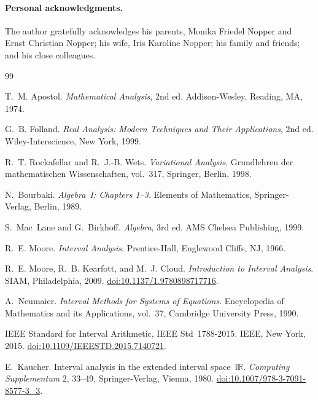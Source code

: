 \documentclass[11pt,a4paper]{article}
\theoremstyle{paperdef}
\begin{document}
\paragraph{Personal acknowledgments.} The author gratefully
acknowledges his parents, Monika Friedel Nopper and Ernst Christian
Nopper; his wife, Iris Karoline Nopper; his family and friends; and
his close colleagues.

\begin{thebibliography}{99}

T.~M. Apostol.
\newblock \emph{Mathematical Analysis}, 2nd ed.
\newblock Addison-Wesley, Reading, MA, 1974.

G.~B. Folland.
\newblock \emph{Real Analysis: Modern Techniques and Their
Applications}, 2nd ed.
\newblock Wiley-Interscience, New York, 1999.

R.~T. Rockafellar and R.~J.-B. Wets.
\newblock \emph{Variational Analysis}.
\newblock Grundlehren der mathematischen Wissenschaften, vol.~317,
Springer, Berlin, 1998.

N.~Bourbaki.
\newblock \emph{Algebra~I: Chapters 1--3}.
\newblock Elements of Mathematics, Springer-Verlag, Berlin, 1989.

S.~Mac~Lane and G.~Birkhoff.
\newblock \emph{Algebra}, 3rd ed.
\newblock AMS Chelsea Publishing, 1999.

R.~E. Moore.
\newblock \emph{Interval Analysis}.
\newblock Prentice-Hall, Englewood Cliffs, NJ, 1966.

R.~E. Moore, R.~B. Kearfott, and M.~J. Cloud.
\newblock \emph{Introduction to Interval Analysis}.
\newblock SIAM, Philadelphia, 2009.
\newblock \href{https://doi.org/10.1137/1.9780898717716}{doi:10.1137/1.9780898717716}.

A.~Neumaier.
\newblock \emph{Interval Methods for Systems of Equations}.
\newblock Encyclopedia of Mathematics and its Applications, vol.~37,
Cambridge University Press, 1990.

IEEE Standard for Interval Arithmetic, IEEE Std~1788-2015.
\newblock IEEE, New York, 2015.
\newblock \href{https://doi.org/10.1109/IEEESTD.2015.7140721}{doi:10.1109/IEEESTD.2015.7140721}.

E.~Kaucher.
\newblock Interval analysis in the extended interval space~$\mathbb{IR}$.
\newblock \emph{Computing Supplementum} 2, 33--49, Springer-Verlag,
Vienna, 1980.
\newblock \href{https://doi.org/10.1007/978-3-7091-8577-3_3}{doi:10.1007/978-3-7091-8577-3\_3}.


\end{thebibliography}
\end{document}

